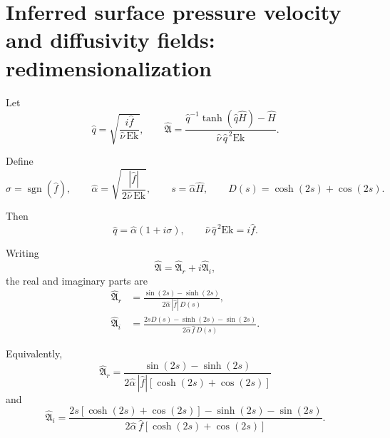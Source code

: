 \documentclass[10pt]{amsart}
\begin{document}
\section{Inferred surface pressure velocity and diffusivity fields: redimensionalization}


Let
\begin{equation}
\widehat q
=
\sqrt{
\frac{i\widehat f}
{\widehat\nu\,\mathrm{Ek}}
},
\qquad
\widehat{\mathfrak A}
=
\frac{
\widehat q^{-1}\tanh(\widehat q\widehat H)-\widehat H
}{
\widehat\nu\,\widehat q^{\,2}\mathrm{Ek}
}.
\end{equation}

Define
\begin{equation}
\sigma=\operatorname{sgn}(\widehat f),
\qquad
\widehat\alpha
=
\sqrt{
\frac{|\widehat f|}
{2\widehat\nu\,\mathrm{Ek}}
},
\qquad
s=\widehat\alpha\widehat H,
\qquad
D(s)=\cosh(2s)+\cos(2s).
\end{equation}

Then
\begin{equation}
\widehat q
=
\widehat\alpha(1+i\sigma),
\qquad
\widehat\nu\,\widehat q^{\,2}\mathrm{Ek}
=
i\widehat f.
\end{equation}

Writing
\begin{equation}
\widehat{\mathfrak A}
=
\widehat{\mathfrak A}_r
+i\widehat{\mathfrak A}_i,
\end{equation}
the real and imaginary parts are
\begin{subequations}
\label{eq:A-real-imag-nd}
\begin{align}
\widehat{\mathfrak A}_r
&=
\frac{
\sin(2s)-\sinh(2s)
}{
2\widehat\alpha\,|\widehat f|\,D(s)
},
\label{eq:A-real-nd}
\\[1ex]
\widehat{\mathfrak A}_i
&=
\frac{
2sD(s)-\sinh(2s)-\sin(2s)
}{
2\widehat\alpha\,\widehat f\,D(s)
}.
\label{eq:A-imag-nd}
\end{align}
\end{subequations}

Equivalently,
\begin{equation}
\boxed{
\widehat{\mathfrak A}_r
=
\frac{
\sin(2s)-\sinh(2s)
}{
2\widehat\alpha\,|\widehat f|
\left[\cosh(2s)+\cos(2s)\right]
}
}
\end{equation}
and
\begin{equation}
\boxed{
\widehat{\mathfrak A}_i
=
\frac{
2s\left[\cosh(2s)+\cos(2s)\right]
-\sinh(2s)-\sin(2s)
}{
2\widehat\alpha\,\widehat f
\left[\cosh(2s)+\cos(2s)\right]
}
}.
\end{equation}
\end{document}
